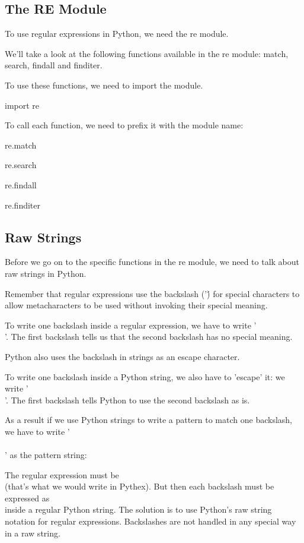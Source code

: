 \documentclass{article}
\begin{document}
\subsection{The RE Module}
To use regular expressions in Python, we need the re module.

We'll take a look at the following functions available in the re module: match, search, findall and finditer.

To use these functions, we need to import the module.

import re

To call each function, we need to prefix it with the module name:

re.match

re.search

re.findall

re.finditer

\subsection{Raw Strings}
Before we go on to the specific functions in the re module, we need to talk about raw strings in Python.

Remember that regular expressions use the backslash ('\') for special characters to allow metacharacters to be used without invoking their special meaning.

To write one backslash inside a regular expression, we have to write '\\'. The first backslash tells us that the second backslash has no special meaning.

Python also uses the backslash in strings as an escape character.

To write one backslash inside a Python string, we also have to 'escape' it:  we write '\\'.  The first backslash tells Python to use the second backslash as is.

As a result if we use Python strings to write a pattern to match one backslash, we have to write '\\\\' as the pattern string: 

The regular expression must be \\ (that’s what we would write in Pythex). 
But then each backslash must be expressed as \\ inside a regular Python string.
The solution is to use Python’s raw string notation for regular expressions. Backslashes are not handled in any special way in a raw string.
\end{document}
